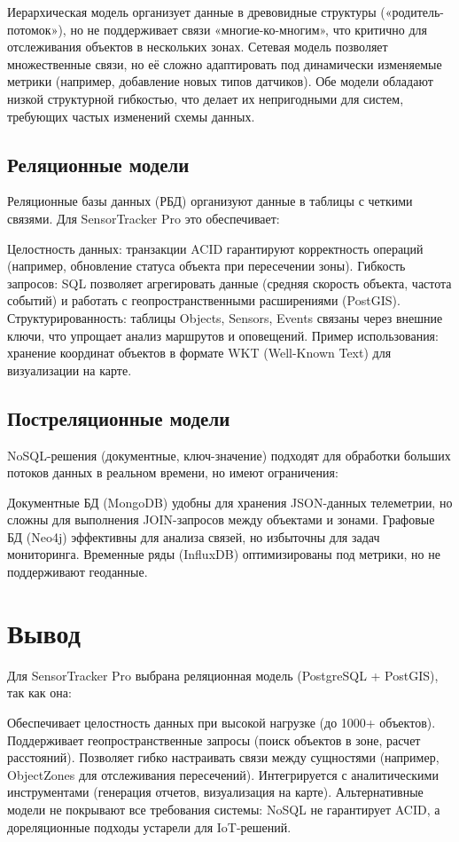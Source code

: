 Иерархическая модель организует данные в древовидные структуры («родитель-потомок»), но не поддерживает связи «многие-ко-многим», что критично для отслеживания объектов в нескольких зонах.
Сетевая модель позволяет множественные связи, но её сложно адаптировать под динамически изменяемые метрики (например, добавление новых типов датчиков).
Обе модели обладают низкой структурной гибкостью, что делает их непригодными для систем, требующих частых изменений схемы данных.

\subsection{Реляционные модели}
Реляционные базы данных (РБД) организуют данные в таблицы с четкими связями. Для SensorTracker Pro это обеспечивает:

Целостность данных: транзакции ACID гарантируют корректность операций (например, обновление статуса объекта при пересечении зоны).
Гибкость запросов: SQL позволяет агрегировать данные (средняя скорость объекта, частота событий) и работать с геопространственными расширениями (PostGIS).
Структурированность: таблицы Objects, Sensors, Events связаны через внешние ключи, что упрощает анализ маршрутов и оповещений.
Пример использования: хранение координат объектов в формате WKT (Well-Known Text) для визуализации на карте.

\subsection{Постреляционные модели}
NoSQL-решения (документные, ключ-значение) подходят для обработки больших потоков данных в реальном времени, но имеют ограничения:

Документные БД (MongoDB) удобны для хранения JSON-данных телеметрии, но сложны для выполнения JOIN-запросов между объектами и зонами.
Графовые БД (Neo4j) эффективны для анализа связей, но избыточны для задач мониторинга.
Временные ряды (InfluxDB) оптимизированы под метрики, но не поддерживают геоданные.
\section{Вывод}
Для SensorTracker Pro выбрана реляционная модель (PostgreSQL + PostGIS), так как она:

Обеспечивает целостность данных при высокой нагрузке (до 1000+ объектов).
Поддерживает геопространственные запросы (поиск объектов в зоне, расчет расстояний).
Позволяет гибко настраивать связи между сущностями (например, ObjectZones для отслеживания пересечений).
Интегрируется с аналитическими инструментами (генерация отчетов, визуализация на карте).
Альтернативные модели не покрывают все требования системы: NoSQL не гарантирует ACID, а дореляционные подходы устарели для IoT-решений.